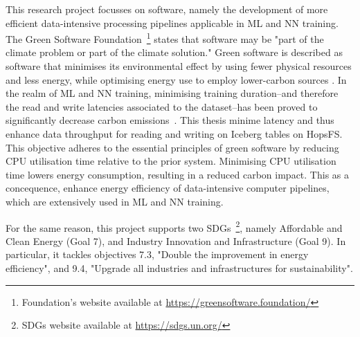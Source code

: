 This research project focusses on software, namely the development of more efficient data-intensive processing pipelines applicable in \gls{ML} and \gls{NN} training. The Green Software Foundation~\footnote{Foundation's website available at \url{https://greensoftware.foundation/}} states that software may be "part of the climate problem or part of the climate solution." Green software is described as software that minimises its environmental effect by using fewer physical resources and less energy, while optimising energy use to employ lower-carbon sources \cite{WhatGreenSoftware2021}. In the realm of \gls{ML} and \gls{NN} training, minimising training duration--and therefore the read and write latencies associated to the dataset--has been proved to significantly decrease carbon emissions~\cite{pattersonCarbonEmissionsLarge2021,pattersonCarbonFootprintMachine2022}. This thesis minime latency and thus enhance data throughput for reading and writing on Iceberg tables on \gls{HopsFS}. This objective adheres to the essential principles of green software by reducing \gls{CPU} utilisation time relative to the prior system. Minimising \gls{CPU} utilisation time lowers energy consumption, resulting in a reduced carbon impact. This as a concequence, enhance energy efficiency of data-intensive computer pipelines, which are extensively used in \gls{ML} and \gls{NN} training.

For the same reason, this project supports two \glspl{SDG}~\footnote{\glspl{SDG} website available at \url{https://sdgs.un.org/}}, namely Affordable and Clean Energy (Goal 7), and Industry Innovation and Infrastructure (Goal 9). In particular, it tackles objectives 7.3, "Double the improvement in energy efficiency", and 9.4, "Upgrade all industries and infrastructures for sustainability".

